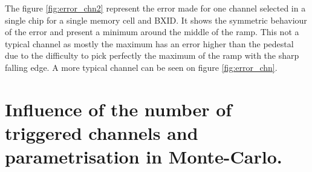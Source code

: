 \documentclass[twoside,a4paper,11pt]{article}
\begin{document}
\begin{appendix}
\begin{figure}[htbp]
	\label{fig:error_calibration}
\end{figure}
The figure \ref{fig:error_chn2} represent the error made for one channel selected in a single chip for a single memory cell and BXID. It shows the symmetric behaviour of the error and present a minimum around the middle of the ramp. This not a typical channel as mostly the maximum has an error higher than the pedestal due to the difficulty to pick perfectly the maximum of the ramp with the sharp falling edge. A more typical channel can be seen on figure \ref{fig:error_chn}.

\newpage
\section{Influence of the number of triggered channels and parametrisation in Monte-Carlo.}
\label{appendix:ped_shift}


\end{appendix}
\end{document}
